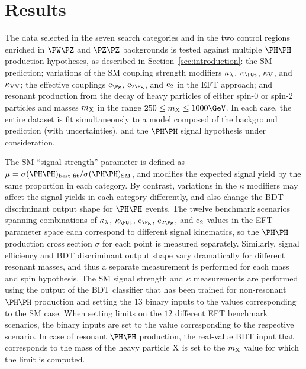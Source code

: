 \section{Results}
\label{sec:results}

The data selected in the seven search categories and in the two
control regions enriched in $\PW\PZ$ and $\PZ\PZ$ backgrounds
is tested against multiple $\HH$ production hypotheses,
as described in Section~\ref{sec:introduction}: the SM prediction;
variations of the SM coupling strength modifiers
$\kappa_{\lambda}$, $\kappat$, $\kappa_{\textrm{V}}$, and $\kappa_{\textrm{V}\textrm{V}}$;
the effective couplings $\cg$, $\cgg$, and $\text{c}_{2}$ in the EFT approach;
and resonant production from the decay of heavy particles of either spin-0 or
spin-2 particles and masses $m_{\textrm{X}}$ in the range $250 \leq m_{\X} \leq 1000\GeV$.
In each case, the entire dataset is fit simultaneously to a model
composed of the background prediction (with uncertainties),
and the $\HH$ signal hypothesis under consideration.

The SM ``signal strength'' parameter is defined as
$\mu = \sigma(\HH)_{\textrm{best fit}} / \sigma(\HH)_{\textrm{SM}}$,
and modifies the expected signal yield by the same proportion in each category.
By contrast, variations in the $\kappa$ modifiers may affect the signal yields in each
category differently, and also change the BDT discriminant output shape for $\HH$ events.
The twelve benchmark scenarios spanning combinations of $\kappa_{\lambda}$, $\kappat$,
$\cg$, $\cgg$, and $\text{c}_{2}$ values in the EFT parameter space each correspond to
different signal kinematics, so the $\HH$ production cross section $\sigma$
for each point is measured separately.
Similarly, signal efficiency and BDT discriminant output shape vary dramatically for different
resonant masses, and thus a separate measurement is performed for each mass and spin hypothesis.
The SM signal strength and $\kappa$ measurements are performed using the output of the BDT classifier
that has been trained for non-resonant $\HH$ production and setting the $13$ binary inputs to the values corresponding to the SM case.
When setting limits on the $12$ different EFT benchmark scenarios, the binary inputs are set to the value corresponding to the respective scenario.
In case of resonant $\HH$ production, the real-value BDT input that corresponds to the mass of the heavy particle $\textrm{X}$ 
is set to the $m_{\textrm{X}}$ value for which the limit is computed.

